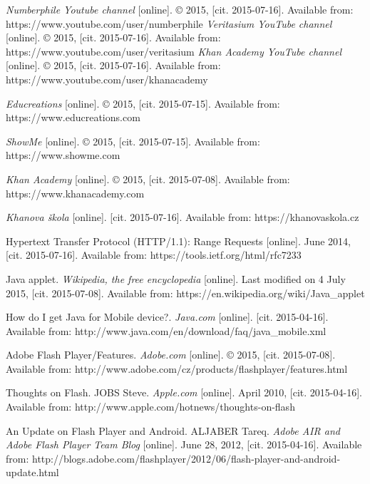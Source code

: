 \begin{thebibliography}{99}
\emph{Numberphile Youtube channel} [online]. © 2015, [cit. 2015-07-16]. Available from: https://www.youtube.com/user/numberphile
\emph{Veritasium YouTube channel} [online]. © 2015, [cit. 2015-07-16]. Available from: https://www.youtube.com/user/veritasium
\emph{Khan Academy YouTube channel} [online]. © 2015, [cit. 2015-07-16]. Available from: https://www.youtube.com/user/khanacademy


\emph{Educreations} [online]. © 2015, [cit. 2015-07-15]. Available from: https://www.educreations.com

\emph{ShowMe} [online]. © 2015, [cit. 2015-07-15]. Available from: https://www.showme.com


\emph{Khan Academy} [online]. © 2015, [cit. 2015-07-08]. Available from: https://www.khanacademy.com

\emph{Khanova škola} [online]. [cit. 2015-07-16]. Available from: https://khanovaskola.cz



Hypertext Transfer Protocol (HTTP/1.1): Range Requests [online]. June 2014, [cit. 2015-07-16]. Available from: https://tools.ietf.org/html/rfc7233


Java applet. \emph{Wikipedia, the free encyclopedia} [online]. Last modified on 4 July 2015, [cit. 2015-07-08]. Available from: https://en.wikipedia.org/wiki/Java\_applet

How do I get Java for Mobile device?. \emph{Java.com} [online]. [cit. 2015-04-16]. Available from: http://www.java.com/en/download/faq/java\_mobile.xml

Adobe Flash Player/Features. \emph{Adobe.com} [online]. © 2015, [cit. 2015-07-08]. Available from: http://www.adobe.com/cz/products/flashplayer/features.html

Thoughts on Flash. JOBS Steve. \emph{Apple.com} [online]. April 2010, [cit. 2015-04-16]. Available from: http://www.apple.com/hotnews/thoughts-on-flash

An Update on Flash Player and Android. ALJABER Tareq. \emph{Adobe AIR and Adobe Flash Player Team Blog} [online]. June 28, 2012, [cit. 2015-04-16]. Available from: http://blogs.adobe.com/flashplayer/2012/06/flash-player-and-android-update.html


\end{thebibliography}
